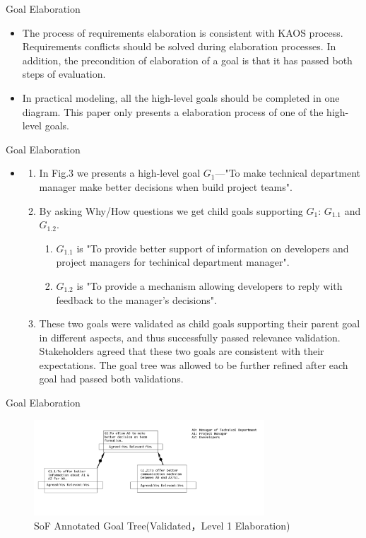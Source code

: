 ﻿\documentclass{beamer}
\begin{document}
\begin{frame} {Goal Elaboration}    %
  \small{
    \begin{itemize}
    \item
      The process of requirements elaboration is consistent with KAOS process. Requirements conflicts should be solved during elaboration processes. In addition, the precondition of elaboration of a goal is that it has passed both steps of evaluation. \pause
    \item
      In practical modeling, all the high-level goals should be completed in one diagram. This paper only presents a elaboration process of one of the high-level goals.\pause
    \end{itemize}
  }
\end{frame}
\begin{frame}  {Goal Elaboration}
  \footnotesize{
    \begin{itemize}
    \item
      \begin{enumerate}
      \item  In Fig.3 we presents a high-level goal $G_1$—"To make technical department manager make better decisions when build project teams".
      \item  By asking Why/How questions we get child goals supporting $G_1$: $G_{1.1}$ and $G_{1.2}$.
        \begin{enumerate}
        \item  $G_{1.1}$ is "To provide better support of information on developers and project managers for techinical department manager".
        \item  $G_{1.2}$ is "To provide a mechanism allowing developers to reply with feedback to the manager's decisions".
        \end{enumerate}
      \item  These two goals were validated as child goals supporting their parent goal in different aspects, and thus successfully passed relevance validation. Stakeholders agreed that these two goals are consistent with their expectations. The goal tree was allowed to be further refined after each goal had passed both validations.\pause
      \end{enumerate}
    \end{itemize}
  }
\end{frame}

\begin{frame}  {Goal Elaboration}
  \begin{figure}
    \includegraphics[width=3.4in]{img/4.PNG}
    \caption{SoF Annotated Goal Tree(Validated，Level 1 Elaboration)}
  \end{figure}
\end{frame}
\end{document}
